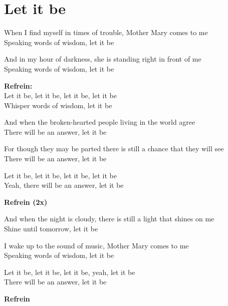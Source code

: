 \section{Let it be}
When I find myself in times of trouble, Mother Mary comes to me\\
Speaking words of wisdom, let it be

And in my hour of darkness, she is standing right in front of me\\
Speaking words of wisdom, let it be

\textbf{Refrein:}\\
Let it be, let it be, let it be, let it be\\
Whisper words of wisdom, let it be

And when the broken-hearted people living in the world agree\\
There will be an answer, let it be

For though they may be parted there is still a chance that they will see\\
There will be an answer, let it be

Let it be, let it be, let it be, let it be\\
Yeah, there will be an answer, let it be

\textbf{Refrein (2x)}

And when the night is cloudy, there is still a light that shines on me\\
Shine until tomorrow, let it be

I wake up to the sound of music, Mother Mary comes to me\\
Speaking words of wisdom, let it be

Let it be, let it be, let it be, yeah, let it be\\
There will be an answer, let it be

\textbf{Refrein}
